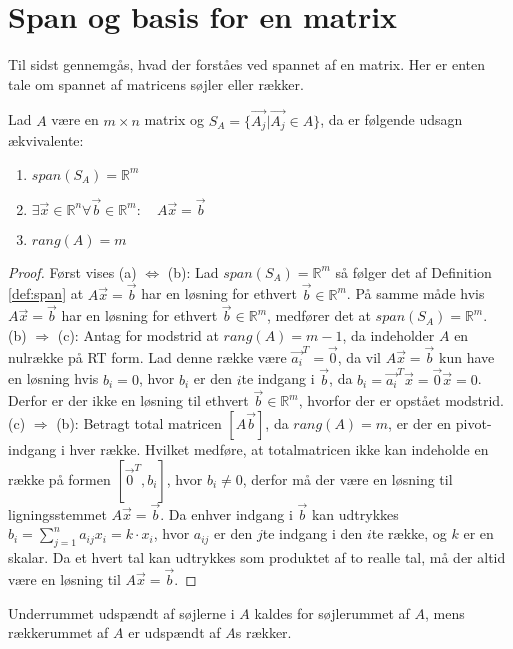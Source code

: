 \section{Span og basis for en matrix}
Til sidst gennemgås, hvad der forståes ved spannet af en matrix.
Her er enten tale om spannet af matricens søjler eller rækker.
\begin{stn}
Lad $A$ være en $m\times n$ matrix og $S_A= \{\vec{A_j}| \vec{ A_j}\in A\}$, da er følgende udsagn ækvivalente:
\begin{enumerate}[label=\alph*]
\item $span(S_A) = \mathds{R}^m$
\item $\exists \vec{x} \in \mathds{R}^n \forall \vec{b} \in \mathds{R}^m: \quad A\vec{x}=\vec{b}$
\item $rang(A) = m$
\end{enumerate}
\end{stn}
\begin{proof}
Først vises (a) $\Leftrightarrow$ (b):
Lad $span(S_A) = \mathds{R}^m$ så følger det af Definition \ref{def:span} at $A\vec{x}= \vec{b}$ har en løsning for ethvert $\vec{b} \in \mathds{R}^m$.
På samme måde hvis $A\vec{x}= \vec{b}$ har en løsning for ethvert $\vec{b} \in \mathds{R}^m$, medfører det at $span(S_A) = \mathds{R}^m$. 
\\(b) $\Rightarrow$ (c):
Antag for modstrid at $rang(A) = m-1$, da indeholder $A$ en nulrække på RT form. 
Lad denne række være $\vec{a_i}^T = \vec{0}$, da vil $A\vec{x} = \vec{b}$ kun have en løsning hvis $b_i=0$, hvor $b_i$ er den $i$te indgang i $\vec{b}$, da $b_i = \vec{a_i}^T \vec{x} = \vec{0} \vec{x} = 0$. 
Derfor er der ikke en løsning til ethvert $\vec{b} \in \mathds{R}^m$, hvorfor der er opstået modstrid.
\\(c) $\Rightarrow$ (b): 
Betragt total matricen $[A \vec{b}]$, da $rang(A) = m$, er der en pivot-indgang i hver række. 
Hvilket medføre, at totalmatricen ikke kan indeholde en række på formen $[\vec{0}^T, b_i]$, hvor $b_i \neq 0$, derfor må der være en løsning til ligningsstemmet $A\vec{x} = \vec{b}$.
Da enhver indgang i $\vec{b}$ kan udtrykkes $b_i = \sum_{j=1}^n a_{ij} x_i = k \cdot x_i$, hvor $a_{ij}$ er den $j$te indgang i den $i$te række, og $k$ er en skalar.
Da et hvert tal kan udtrykkes som produktet af to realle tal, må der altid være en løsning til $A\vec{x}=\vec{b}$.
\end{proof}
Underrummet udspændt af søjlerne i $A$ kaldes for søjlerummet af $A$, mens rækkerummet af $A$ er udspændt af $A$s rækker.
